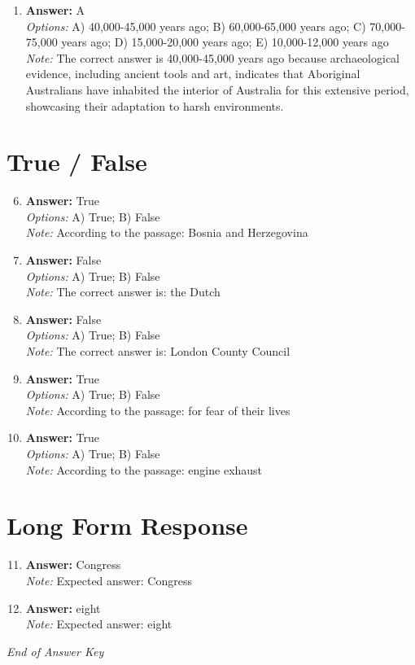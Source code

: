 \documentclass[12pt]{article}
\begin{document}
\begin{enumerate}[label=\arabic*.]
\\ \textit{Note:} Tiwanaku, known for its impressive monuments and extensive agricultural systems, was one of the largest and most influential civilizations in the Andean region, demonstrating significant urban development and political organization in the ancient world.
\item \textbf{Answer:} A
\\ \textit{Options:} A) 40,000-45,000 years ago; B) 60,000-65,000 years ago; C) 70,000-75,000 years ago; D) 15,000-20,000 years ago; E) 10,000-12,000 years ago
\\ \textit{Note:} The correct answer is 40,000-45,000 years ago because archaeological evidence, including ancient tools and art, indicates that Aboriginal Australians have inhabited the interior of Australia for this extensive period, showcasing their adaptation to harsh environments.
\end{enumerate}

\section*{True / False}
\begin{enumerate}[label=\arabic*.]
\setcounter{enumi}{5}
\item \textbf{Answer:} True
\\ \textit{Options:} A) True; B) False
\\ \textit{Note:} According to the passage: Bosnia and Herzegovina
\item \textbf{Answer:} False
\\ \textit{Options:} A) True; B) False
\\ \textit{Note:} The correct answer is: the Dutch
\item \textbf{Answer:} False
\\ \textit{Options:} A) True; B) False
\\ \textit{Note:} The correct answer is: London County Council
\item \textbf{Answer:} True
\\ \textit{Options:} A) True; B) False
\\ \textit{Note:} According to the passage: for fear of their lives
\item \textbf{Answer:} True
\\ \textit{Options:} A) True; B) False
\\ \textit{Note:} According to the passage: engine exhaust
\end{enumerate}

\section*{Long Form Response}
\begin{enumerate}[label=\arabic*.]
\setcounter{enumi}{10}
\item \textbf{Answer:} Congress
\\ \textit{Note:} Expected answer: Congress
\item \textbf{Answer:} eight
\\ \textit{Note:} Expected answer: eight
\end{enumerate}

\vfill
\noindent\textit{End of Answer Key}
\end{document}
